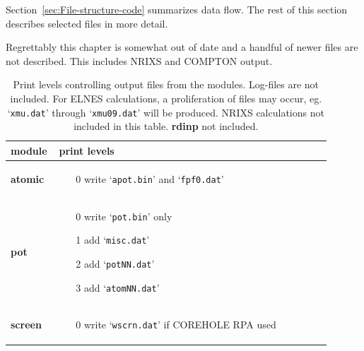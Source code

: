 \documentclass[11pt,oneside]{report} %
\newcommand{\file}[1]{`\texttt{#1}'}
\newcommand{\module}[1]{\textrm{\bf{#1}}}
\begin{document}
\begin{latexonly}
Section~\ref{sec:File-structure-code} summarizes data flow.  The rest of this section describes selected files in more detail.

Regrettably this chapter is somewhat out of date and a handful of newer files are not described.  This includes NRIXS and COMPTON output.

\newpage

\begin{table}[htbp] \label{table:printlevels}
    \caption[Print levels]{Print levels controlling output files from the modules.  Log-files are not included.
      For ELNES calculations, a proliferation of files may occur, eg. \file{xmu.dat} through \file{xmu09.dat} will be produced.
      NRIXS calculations not included in this table. \module{rdinp} not included.}
    \begin{center}
    \begin{tabular}[h]{p{0.1\linewidth}p{0.8\linewidth}}
          \hline\hline
      module & \hspace{5em} print levels\\
      \hline
      \module{atomic} &
      \vspace{-4ex}
      \begin{itemize}
        \tightlist
      \item[0] write \file{apot.bin} and \file{fpf0.dat}
      \end{itemize}\\
      \module{pot} &
      \vspace{-4ex}
      \begin{itemize}
        \tightlist
      \item[0] write \file{pot.bin} only
      \item[1] add \file{misc.dat}
      \item[2] add \file{potNN.dat}
      \item[3] add \file{atomNN.dat}
      \end{itemize}\\
      \module{screen} &
      \vspace{-4ex}
      \begin{itemize}
        \tightlist
      \item[0] write \file{wscrn.dat} if COREHOLE RPA used
      \end{itemize}\\

\end{tabular}
\end{center}
\end{table}
\end{latexonly}
\end{document}
